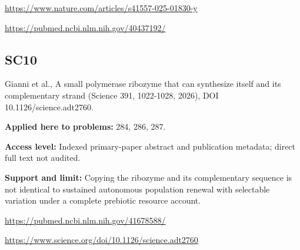\documentclass[11pt]{article}
\begin{document}
\url{https://www.nature.com/articles/s41557-025-01830-y}

\url{https://pubmed.ncbi.nlm.nih.gov/40437192/}

\subsection*{SC10}\label{check:SC10}

Gianni et al., A small polymerase ribozyme that can synthesize itself and its complementary strand (Science 391, 1022-1028, 2026), DOI 10.1126/science.adt2760.

\textbf{Applied here to problems:} 284, 286, 287.

\textbf{Access level:} Indexed primary-paper abstract and publication metadata; direct full text not audited.

\textbf{Support and limit:} Copying the ribozyme and its complementary sequence is not identical to sustained autonomous population renewal with selectable variation under a complete prebiotic resource account.

\url{https://pubmed.ncbi.nlm.nih.gov/41678588/}

\url{https://www.science.org/doi/10.1126/science.adt2760}
\end{document}
